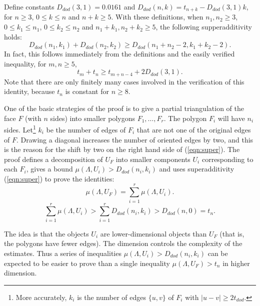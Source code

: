 \documentclass{article} %
\begin{document}
Define constants $D_{dod}(3,1) = 0.0161$ and $D_{dod}(n,k) = t_{n+k} - D_{dod}(3,1)k$,
for $n\ge 3$, $0\le k\le n$ and $n+k\ge 5$.  With these definitions,
when $n_1,n_2\ge 3$, $0\le k_1\le n_1$, $0\le k_2\le n_2$ and $n_1+k_1,n_2+k_2\ge 5$,  the following supperadditivity holds:
\begin{equation}\label{eqn:super}
  D_{dod}(n_1,k_1) + D_{dod}(n_2,k_2) \ge D_{dod}(n_1+n_2-2,k_1+k_2-2).
\end{equation}
In fact, this follows immediately from the definitions and the
easily verified inequality,
for $m,n\ge 5$,
$$
t_m + t_n \ge t_{m+n-4} + 2 D_{dod}(3,1).
$$
Note that there are only finitely many cases involved in the
verification of this identity,
because $t_n$ is constant for $n\ge 8$.


One of the basic strategies of the proof is to give a partial triangulation
of the face $F$ (with $n$ sides)
into smaller polygons $F_1,\ldots,F_r$.   The polygon
$F_i$ will have $n_i$ sides.  Let\footnote{More accurately,
$k_i$ is the number of edges $\{u,v\}$ of $F_i$ with $|u-v|\ge 2t_{dod}$.} 
$k_i$ be the number of edges
of $F_i$ that are not one of the original edges of $F$. 
Drawing a diagonal increases the number of oriented edges by
two, and this is the reason for the shift by two on the right
hand side of (\ref{eqn:super}).   The proof defines
a decomposition of $U_F$ into smaller components $U_i$ corresponding
to each $F_i$, gives a bound $\mu(\Lambda,U_i) > D_{dod}(n_i,k_i)$
and uses superadditivity (\ref{eqn:super}) to prove the identities:
\begin{equation}\label{eqn:mu}
  \mu(\Lambda,U_F) = \sum_{i=1}^r \mu(\Lambda,U_i).
\end{equation}
\begin{equation}\label{eqn:super-mu}
\sum_{i=1}^r \mu(\Lambda,U_i) > \sum_{i=1}^r D_{dod}(n_i,k_i)
 > D_{dod}(n,0) = t_n.
\end{equation}

The idea is that the objects $U_i$ are lower-dimensional objects
than $U_F$ (that is, the polygons  have fewer edges).
The dimension controls the complexity
of the estimates.  Thus a series of inequalities $\mu(\Lambda,U_i) > D_{dod}(n_i,k_i)$
can be expected to be easier to prove than a single inequality
$\mu(\Lambda,U_F) > t_n$ in higher dimension.  
\end{document}
